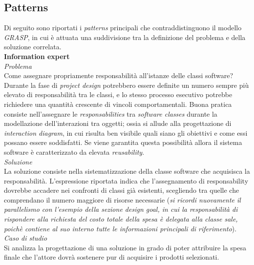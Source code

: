\documentclass{article}
\begin{document}
\subsection*{Patterns}
\large
Di seguito sono riportati i \textit{patterns} principali che contraddistinguono il modello \textit{GRASP}, in cui è attuata una suddivisione tra la definizione del problema e della soluzione correlata.\vspace*{14pt}\\
\textbf{Information expert}\vspace*{7pt}\\
\textit{Problema}\\
Come assegnare propriamente responsabilità all'istanze delle classi software?\vspace*{7pt}\\
Durante la fase di \textit{project design} potrebbero essere definite un numero sempre più elevato di responsabilità tra le classi, e lo stesso processo esecutivo potrebbe richiedere una quantità crescente di vincoli comportamentali. Buona pratica consiste nell'assegnare le \textit{responsabilities} tra \textit{software classes} durante la modellazione dell'interazioni tra oggetti; 
ossia si allude alla progettazione di \textit{interaction diagram}, in cui risulta ben visibile quali siano gli obiettivi e come essi possano essere soddisfatti. Se viene garantita questa possibilità allora il sistema software è caratterizzato da elevata \textit{reusability}.\vspace*{14pt}\\ 
\textit{Soluzione}\\
La soluzione consiste nella sistematizzazione della classe software che acquisisca la responsabilità. L'espressione riportata indica che l'assegnamento di responsability dovrebbe accadere nei confronti di classi già esistenti, scegliendo tra quelle che comprendano il numero maggiore di risorse necessarie (\textit{si ricordi nuovamente il parallelismo con l'esempio della sezione design goal, in cui la responsabilità di rispondere alla richiesta del costo totale della spesa è delegata alla classe sale, poichè contiene al suo interno tutte le informazioni principali di riferimento}).\vspace*{14pt}\\
\textit{Caso di studio}\\
Si analizza la progettazione di una soluzione in grado di poter attribuire la spesa finale che l'attore dovrà sostenere pur di acquisire i prodotti selezionati.
\end{document}
